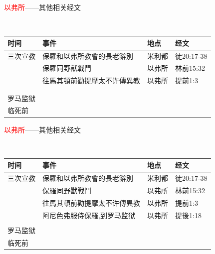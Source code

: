 \documentclass{beamer}
\begin{document}
\begin{frame}{\textcolor{red}{以弗所}——其他相关经文}
\begin{block}{}\\
\begin{table}
\hspace{-1.cm}
\begin{tabular}{l|l|l|l}
时间 & 事件 &地点&经文\\\hline\hline
三次宣教&保羅和以弗所教會的長老辭別&米利都&徒20:17-38\\
&保羅同野獸戰鬥&以弗所&林前15:32\\
&往馬其頓前勸提摩太不许傳異教&以弗所&提前1:3 \\
&&& \\
&&&\\\hline\hline
罗马监狱&&&\\\hline\hline
临死前&&&\\\hline\hline
\end{tabular}
\end{table}
\end{block}
\end{frame}


\begin{frame}{\textcolor{red}{以弗所}——其他相关经文}
\begin{block}{}\\
\begin{table}
\hspace{-1.cm}
\begin{tabular}{l|l|l|l}
时间 & 事件 &地点&经文\\\hline\hline
三次宣教&保羅和以弗所教會的長老辭別&米利都&徒20:17-38\\
&保羅同野獸戰鬥&以弗所&林前15:32\\
&往馬其頓前勸提摩太不许傳異教&以弗所&提前1:3\\
&阿尼色弗服侍保羅,到罗马监狱&以弗所&提後1:18 \\
&&&\\\hline\hline
罗马监狱&&&\\\hline\hline
临死前&&&\\\hline\hline
\end{tabular}
\end{table}
\end{block}
\end{frame}
\end{document}

